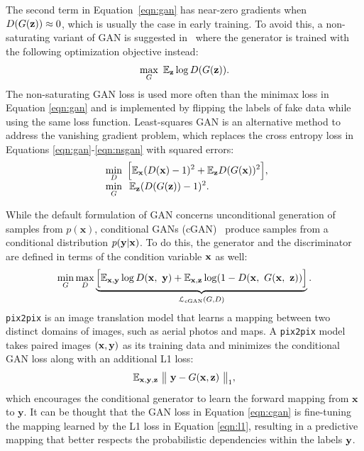 The second term in Equation~\ref{eqn:gan} has near-zero gradients when $D(G(\mathbf{z})) \approx 0$, which is usually the case in early training. To avoid this, a non-saturating variant of GAN is suggested in~\cite{goodfellow2014gan} where the generator is trained with the following optimization objective instead:
\begin{equation}\label{eqn:nsgan}
\max_{G}~ \mathbb{E}_{\mathbf{z}} \log D(G(\mathbf{z})).
\end{equation}
The non-saturating GAN loss is used more often than the minimax loss in Equation \ref{eqn:gan} and is implemented by flipping the labels of fake data while using the same loss function.
Least-squares GAN \cite{mao2017lsgan} is an alternative method to address the vanishing gradient problem, which replaces the cross entropy loss in Equations \ref{eqn:gan}-\ref{eqn:nsgan} with squared errors:%
\begin{equation}\label{eqn:lsgan}
	\begin{array}{l@{}l}
	\displaystyle\min_{D} ~\Big [ \E_{\x} (D(\x) - 1)^2 + \E_{\z} D(G(\x))^2 \Big ], \\
	\displaystyle\min_{G} ~\>\E_{\z} (D(G(\z)) - 1)^2.
	\end{array}
\end{equation}


While the default formulation of GAN concerns unconditional generation of samples from $p(\mathbf{x})$, conditional GANs (cGAN)~\cite{mirza2014conditional} produce samples from a conditional distribution $p(\mathbf{y}|\mathbf{x})$. To do this, the generator and the discriminator are defined in terms of                                                                                                                                                                                                                                                     the condition variable $\mathbf{x}$ as well:
\begin{equation}
\label{eqn:cgan}
\min_{G}\max_{D}\underbrace{\Big [ \mathbb{E}_{\mathbf{x},\mathbf{y}} \log D(\mathbf{x},~\mathbf{y}) + \mathbb{E}_{\mathbf{x},\mathbf{z}} \log (1 - D ( \mathbf{x},~ G(\mathbf{x},~\mathbf{z})) \Big ]}_{\mathcal{L}_{\text{cGAN}}(G, D)}.
\end{equation}
\texttt{pix2pix} \cite{isola2017pix2pix} is an image translation model that learns a mapping between two distinct domains of images, such as aerial photos and maps.
A \texttt{pix2pix} model takes paired images $(\mathbf{x}, \mathbf{y})$ as its training data and minimizes the conditional GAN loss along with an additional L1 loss:
\begin{equation}\label{eqn:l1}
\mathbb{E}_{\mathbf{x},\mathbf{y},\mathbf{z}} ~ \big \lVert ~ \mathbf{y} - G(\mathbf{x}, \mathbf{z}) ~ \big \rVert_1,
\end{equation}
which encourages the conditional generator to learn the forward mapping from $\mathbf{x}$ to $\mathbf{y}$. It can be thought that the GAN loss in Equation \ref{eqn:cgan} is fine-tuning the mapping learned by the L1 loss in Equation \ref{eqn:l1}, resulting in a predictive mapping that better respects the probabilistic dependencies within the labels $\mathbf{y}$.

